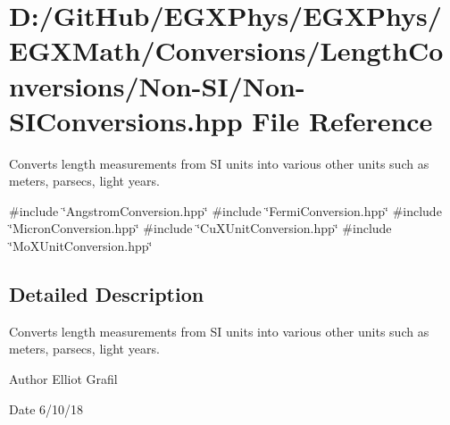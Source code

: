 \hypertarget{_non-_s_i_conversions_8hpp}{}\section{D\+:/\+Git\+Hub/\+E\+G\+X\+Phys/\+E\+G\+X\+Phys/\+E\+G\+X\+Math/\+Conversions/\+Length\+Conversions/\+Non-\/\+S\+I/\+Non-\/\+S\+I\+Conversions.hpp File Reference}
\label{_non-_s_i_conversions_8hpp}


Converts length measurements from SI units into various other units such as meters, parsecs, light years.  


{\ttfamily \#include \char`\"{}Angstrom\+Conversion.\+hpp\char`\"{}}\newline
{\ttfamily \#include \char`\"{}Fermi\+Conversion.\+hpp\char`\"{}}\newline
{\ttfamily \#include \char`\"{}Micron\+Conversion.\+hpp\char`\"{}}\newline
{\ttfamily \#include \char`\"{}Cu\+X\+Unit\+Conversion.\+hpp\char`\"{}}\newline
{\ttfamily \#include \char`\"{}Mo\+X\+Unit\+Conversion.\+hpp\char`\"{}}\newline


\subsection{Detailed Description}
Converts length measurements from SI units into various other units such as meters, parsecs, light years. 

\begin{DoxyAuthor}{Author}
Elliot Grafil 
\end{DoxyAuthor}
\begin{DoxyDate}{Date}
6/10/18 
\end{DoxyDate}
